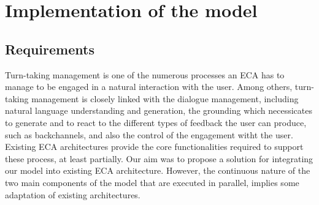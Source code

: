\section{Implementation of the model}
\label{impl}

\subsection{Requirements}

Turn-taking management is one of the numerous processes an ECA has to manage to be engaged in a natural interaction with the user. 
Among others, turn-taking management is closely linked with 
the dialogue management, including natural language understanding and generation, 
the grounding which necessicates to generate and to react to the different types of feedback the user can produce, such as backchannels, 
and also the control of the engagement witht the user. 
Existing ECA architectures provide the core functionalities required to support these process, at least partially. 
Our aim was to propose a solution for integrating our model into existing ECA architecture.
However, the continuous nature of the two main components of the model that are executed in parallel, implies some adaptation of existing architectures. 




